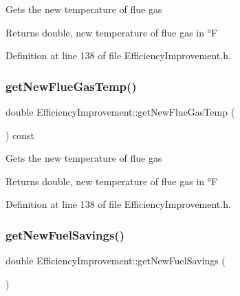 Gets the new temperature of flue gas

\begin{DoxyReturn}{Returns}
double, new temperature of flue gas in °F 
\end{DoxyReturn}


Definition at line 138 of file Efficiency\+Improvement.\+h.

\mbox{\label{class_efficiency_improvement_a4de84ef27e3b4c518319fea77d039845}} 
\subsubsection{\texorpdfstring{get\+New\+Flue\+Gas\+Temp()}{getNewFlueGasTemp()}\hspace{0.1cm}{\footnotesize\ttfamily [3/3]}}
{\footnotesize\ttfamily double Efficiency\+Improvement\+::get\+New\+Flue\+Gas\+Temp (\begin{DoxyParamCaption}{ }\end{DoxyParamCaption}) const\hspace{0.3cm}{\ttfamily [inline]}}

Gets the new temperature of flue gas

\begin{DoxyReturn}{Returns}
double, new temperature of flue gas in °F 
\end{DoxyReturn}


Definition at line 138 of file Efficiency\+Improvement.\+h.

\mbox{\label{class_efficiency_improvement_a1b85007b7b046b998443f5eb267822f9}} 
\subsubsection{\texorpdfstring{get\+New\+Fuel\+Savings()}{getNewFuelSavings()}\hspace{0.1cm}{\footnotesize\ttfamily [1/3]}}
{\footnotesize\ttfamily double Efficiency\+Improvement\+::get\+New\+Fuel\+Savings (\begin{DoxyParamCaption}{ }\end{DoxyParamCaption})}

